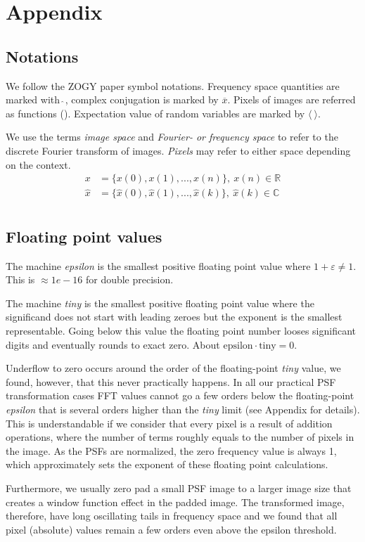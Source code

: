 \documentclass[11pt]{article}
\begin{document}
\section{Appendix\label{sec:appendix}}
\subsection{Notations}
We follow the ZOGY paper symbol notations. Frequency space quantities are
marked with \(\hat{\ }\), complex conjugation is marked by
\(\overline{x}\). Pixels of images are referred as functions
(). Expectation value of random variables are marked by
\(\langle\ \rangle\).
%
\par We use the terms \emph{image space} and \emph{Fourier- or frequency
  space} to refer to the discrete Fourier transform of images. \emph{Pixels}
may refer to either space depending on the context.
\begin{align}
x &= \{x(0), x(1), ... , x(n) \},\ x(n) \in \mathbb{R}\\
\hat{x} &= \{\hat{x}(0), \hat{x}(1), ... , \hat{x}(k) \},\ \hat{x}(k) \in
\mathbb{C}\\
\label{eq:img_func}
\end{align}
%
\subsection{Floating point values\label{sec:floating_point}}
The machine \emph{epsilon} is the smallest positive floating point value
where \(1 + \varepsilon \neq 1\). This is \(\approx 1e-16\) for double
precision.
%
\par The machine \emph{tiny} is the smallest positive floating point value
where the significand does not start with leading zeroes but the exponent is
the smallest representable. Going below this value the floating point number
looses significant digits and eventually rounds to exact zero. About
\(\mathrm{epsilon}\cdot\mathrm{tiny} = 0\).
%
\par Underflow to zero occurs around the order of the floating-point
\emph{tiny} value, we found, however, that this never practically happens. In
all our practical PSF transformation cases FFT values cannot go a few orders
below the floating-point \emph{epsilon} that is several orders higher than
the \emph{tiny} limit (see Appendix for details). This is understandable if
we consider that every pixel is a result of addition operations, where the
number of terms roughly equals to the number of pixels in the image. As the
PSFs are normalized, the zero frequency value is always 1, which
approximately sets the exponent of these floating point calculations.
%
\par Furthermore, we usually zero pad a small PSF image to a larger image
size that creates a window function effect in the padded image. The
transformed image, therefore, have long oscillating tails in frequency space
and we found that all pixel (absolute) values remain a few orders even above
the epsilon threshold.
%
\end{document}
